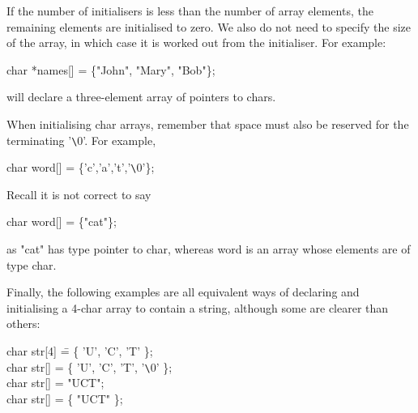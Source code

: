 \noindent
     If the  number of initialisers is less than the number of array
elements, the remaining elements are initialised to zero. We also do
not need to specify the size  of the  array, in  which case it is
worked out from the initialiser.  For example:
\begin{code}
char *names[] = \{"John", "Mary", "Bob"\};
\end{code}
\noindent
     will declare a three-element array of pointers to chars.

     When initialising  {\cd char} arrays, remember that space must
also be reserved for the terminating {\cd '\verb+\+0'}.  For example,
\begin{code}
char word[] = \{'c','a','t','\verb+\+0'\};
\end{code}
\noindent
Recall it is not correct to say
\begin{code}
char word[] = \{"cat"\};
\end{code}
\noindent
as {\cd "cat"} has type {\ms pointer to char\/}, whereas {\cd word}
is an array whose elements are of type {\cd char}.

Finally, the following examples are all equivalent ways of declaring
and initialising a 4-{\cd char} array to contain a string, although some 
are clearer than others:
\begin{code}
char str[4] \== \{ 'U', 'C', 'T' \}; \\
char str[] \>= \{ 'U', 'C', 'T', '\verb+\+0' \}; \\
char str[] \>= "UCT"; \\
char str[] \>= \{ "UCT" \};
\end{code}
